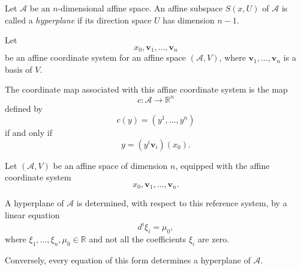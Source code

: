 \documentclass[12pt]{article}
\begin{document}
\begin{definition}
Let \(\mathcal A\) be an \(n\)-dimensional affine space. An affine
subspace \(S(x,U)\) of \(\mathcal A\) is called a \emph{hyperplane} if its
direction space \(U\) has dimension \(n-1\).
\end{definition}

\begin{definition}
Let
\[
x_0,\mathbf v_1,\ldots,\mathbf v_n
\]
be an affine coordinate system for an affine space $(\mathcal A,V)$, where
$\mathbf v_1,\ldots,\mathbf v_n$ is a basis of $V$.

The coordinate map associated with this affine coordinate system is the map
\[
c:\mathcal A\longrightarrow\mathbb R^n
\]
defined by
\[
c(y)=(y^1,\ldots,y^n)
\]
if and only if
\[
y=(y^i\mathbf v_i)(x_0).
\]
\end{definition}

\begin{proposition}
Let $(\mathcal A,V)$ be an affine space of dimension $n$, equipped with the
affine coordinate system
\[
x_0,\mathbf v_1,\ldots,\mathbf v_n.
\]

A hyperplane of $\mathcal A$ is determined, with respect to this reference
system, by a linear equation
\[
d^i\xi_i=\mu_0,
\]
where $\xi_1,\ldots,\xi_n,\mu_0\in\mathbb R$ and not all the
coefficients $\xi_i$ are zero.

Conversely, every equation of this form determines a hyperplane of
$\mathcal A$.
\end{proposition}
\end{document}
